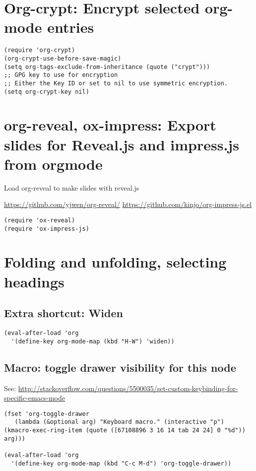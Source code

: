 \documentclass[10pt]{article}
\begin{document}
\section{Org-crypt: Encrypt selected org-mode entries}
\label{sec-12}

\begin{verbatim}
(require 'org-crypt)
(org-crypt-use-before-save-magic)
(setq org-tags-exclude-from-inheritance (quote ("crypt")))
;; GPG key to use for encryption
;; Either the Key ID or set to nil to use symmetric encryption.
(setq org-crypt-key nil)
\end{verbatim}

\section{org-reveal, ox-impress: Export slides for Reveal.js and impress.js from orgmode}
\label{sec-13}

Load org-reveal to make slides with reveal.js

\url{https://github.com/yjwen/org-reveal/}
\url{https://github.com/kinjo/org-impress-js.el}

\begin{verbatim}
(require 'ox-reveal)
(require 'ox-impress-js)
\end{verbatim}

\section{Folding and unfolding, selecting headings}
\label{sec-14}

\subsection{Extra shortcut: Widen}
\label{sec-14-1}
\begin{verbatim}
(eval-after-load 'org
  '(define-key org-mode-map (kbd "H-W") 'widen))
\end{verbatim}
\subsection{Macro: toggle drawer visibility for this node}
\label{sec-14-2}

See: \url{http://stackoverflow.com/questions/5500035/set-custom-keybinding-for-specific-emacs-mode}

\begin{verbatim}
(fset 'org-toggle-drawer
   (lambda (&optional arg) "Keyboard macro." (interactive "p") (kmacro-exec-ring-item (quote ([67108896 3 16 14 tab 24 24] 0 "%d")) arg)))

(eval-after-load 'org
  '(define-key org-mode-map (kbd "C-c M-d") 'org-toggle-drawer))
\end{verbatim}
\end{document}
